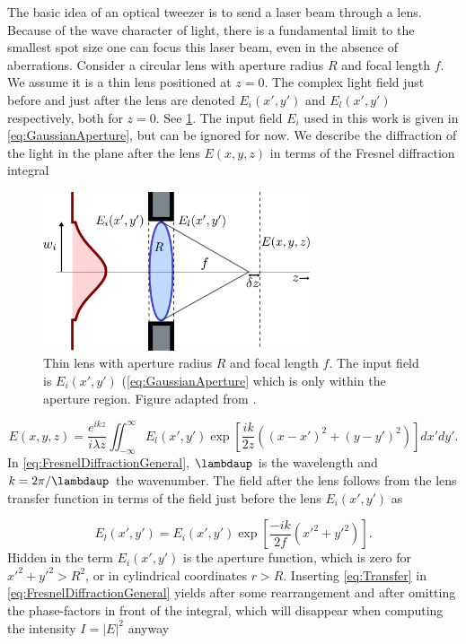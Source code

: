 The basic idea of an optical tweezer is to send a laser beam through a lens.
Because of the wave character of light, there is a fundamental limit to the smallest spot size one can focus this laser beam, even in the absence of aberrations.
Consider a circular lens with aperture radius $R$ and focal length $f$.
We assume it is a thin lens positioned at $z=0$.
The complex light field just before and just after the lens are denoted $E_i(x',y')$ and $E_l(x',y')$ respectively, both for $z=0$.
See \cref{fig:LensAperture}.
The input field $E_i$ used in this work is given in \cref{eq:GaussianAperture}, but can be ignored for now.
We describe the diffraction of the light in the plane after the lens $E(x,y,z)$ in terms of the Fresnel diffraction integral \cite{Goodman2005}

\begin{figure}
	\centering
	\includegraphics[width=0.7\textwidth]{figures/lens.pdf}
	\caption{Thin lens with aperture radius $R$ and focal length $f$. 
	The input field is $E_i(x',y')$ (\cref{eq:GaussianAperture} which is only within the aperture region. Figure adapted from \cite{Leseleuc2018,Gu2000}.}
	\label{fig:LensAperture}
\end{figure}

\begin{equation}\label{eq:FresnelDiffractionGeneral}
    E(x,y,z) = 
    \frac{e^{ikz}}{i \lambda z} \iint_{-\infty}^{\infty} E_l(x',y') \exp{\left[\frac{ik}{2z}\left((x-x')^2+(y-y')^2\right)\right]} dx'dy'.
\end{equation}
In \cref{eq:FresnelDiffractionGeneral}, $\lambdaup$ is the wavelength and $k=2\pi/\lambdaup$ the wavenumber.
The field after the lens follows from the lens transfer function in terms of the field just before the lens $E_i(x',y')$ as \cite{Goodman2005}

\begin{equation}\label{eq:Transfer}
	E_l(x',y')= E_i(x',y') \exp{
		\left[\frac{-i k}{2 f}(x'^2+y'^2)\right].
	}
\end{equation}
Hidden in the term $E_i(x',y')$ is the aperture function, which is zero for $x'^2+y'^2>R^2$, or in cylindrical coordinates $r>R$.
Inserting \cref{eq:Transfer} in \cref{eq:FresnelDiffractionGeneral} yields after some rearrangement and after omitting the phase-factors in front of the integral, which will disappear when computing the intensity $I=|E|^2$ anyway \cite{Gu2000}


